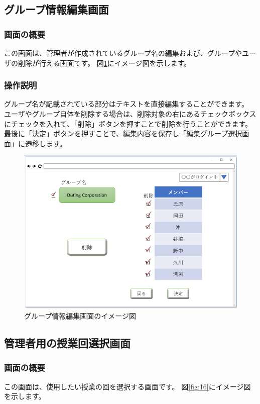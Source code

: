 \newpage

\subsection{グループ情報編集画面}
\subsubsection{画面の概要}
この画面は、管理者が作成されているグループ名の編集および、グループやユーザの削除が行える画面です。
図\ref{fig:15}にイメージ図を示します。

\subsubsection{操作説明}
グループ名が記載されている部分はテキストを直接編集することができます。
ユーザやグループ自体を削除する場合は、削除対象の右にあるチェックボックスにチェックを入れて、「削除」ボタンを押すことで削除を行うことができます。
最後に「決定」ボタンを押すことで、編集内容を保存し「編集グループ選択画面」に遷移します。

\begin{figure}[htbp]
  \begin{center}
    \includegraphics[width=0.8\linewidth,clip]{./img/15.png}
    \caption{グループ情報編集画面のイメージ図}\label{fig:15}
  \end{center}
\end{figure}

\newpage

\subsection{管理者用の授業回選択画面}
\subsubsection{画面の概要}
この画面は、使用したい授業の回を選択する画面です。
図\ref{fig:16}にイメージ図を示します。

